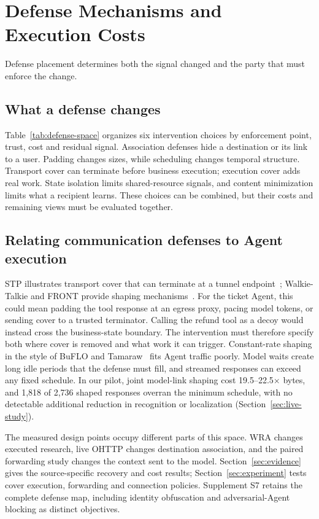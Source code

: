 \section{Defense Mechanisms and Execution Costs}\label{sec:defenses}
Defense placement determines both the signal changed and the party that must enforce the change.
\subsection{What a defense changes}
Table~\ref{tab:defense-space} organizes six intervention choices by enforcement point, trust, cost and residual signal. Association defenses hide a destination or its link to a user. Padding changes sizes, while scheduling changes temporal structure. Transport cover can terminate before business execution; execution cover adds real work. State isolation limits shared-resource signals, and content minimization limits what a recipient learns. These choices can be combined, but their costs and remaining views must be evaluated together.




\subsection{Relating communication defenses to Agent execution}
STP illustrates transport cover that can terminate at a tunnel endpoint~\cite{apthorpe2019stp}; Walkie-Talkie and FRONT provide shaping mechanisms~\cite{wang2017walkietalkie,gong2020front}. For the ticket Agent, this could mean padding the tool response at an egress proxy, pacing model tokens, or sending cover to a trusted terminator. Calling the refund tool as a decoy would instead cross the business-state boundary. The intervention must therefore specify both where cover is removed and what work it can trigger. Constant-rate shaping in the style of BuFLO and Tamaraw~\cite{dyer2012peekaboo,cai2014tamaraw} fits Agent traffic poorly. Model waits create long idle periods that the defense must fill, and streamed responses can exceed any fixed schedule. In our pilot, joint model-link shaping cost 19.5--22.5$\times$ bytes, and 1,818 of 2,736 shaped responses overran the minimum schedule, with no detectable additional reduction in recognition or localization (Section~\ref{sec:live-study}).

The measured design points occupy different parts of this space. WRA changes executed research, live OHTTP changes destination association, and the paired forwarding study changes the context sent to the model. Section~\ref{sec:evidence} gives the source-specific recovery and cost results; Section~\ref{sec:experiment} tests cover execution, forwarding and connection policies. Supplement S7 retains the complete defense map, including identity obfuscation and adversarial-Agent blocking as distinct objectives.

